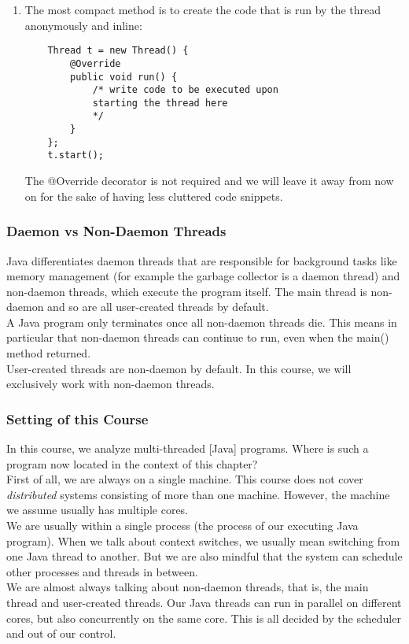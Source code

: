 \documentclass[main]{subfiles}
\begin{document}
\begin{enumerate}
    \item The most compact method is to create the code that is run by the thread anonymously and inline:
    \begin{verbatim}
    Thread t = new Thread() {
        @Override
        public void run() {
            /* write code to be executed upon
            starting the thread here
            */
        }
    };
    t.start();
    \end{verbatim}
    The @Override decorator is not required and we will leave it away from now on for the sake of having less cluttered code snippets.
\end{enumerate}

\subsubsection{Daemon vs Non-Daemon Threads}
Java differentiates daemon threads that are responsible for background tasks like memory management (for example the garbage collector is a daemon thread) and non-daemon threads, which execute the program itself. The main thread is non-daemon and so are all user-created threads by default.\\
A Java program only terminates once all non-daemon threads die. This means in particular that non-daemon threads can continue to run, even when the main() method returned.\\
User-created threads are non-daemon by default. In this course, we will exclusively work with non-daemon threads.

\subsubsection{Setting of this Course}
In this course, we analyze multi-threaded [Java] programs. Where is such a program now located in the context of this chapter?\\
First of all, we are always on a single machine. This course does not cover \textit{distributed} systems consisting of more than one machine. However, the machine we assume usually has multiple cores.\\
We are usually within a single process (the process of our executing Java program). When we talk about context switches, we usually mean switching from one Java thread to another. But we are also mindful that the system can schedule other processes and threads in between.\\
We are almost always talking about non-daemon threads, that is, the main thread and user-created threads. Our Java threads can run in parallel on different cores, but also concurrently on the same core. This is all decided by the scheduler and out of our control.
\end{document}
